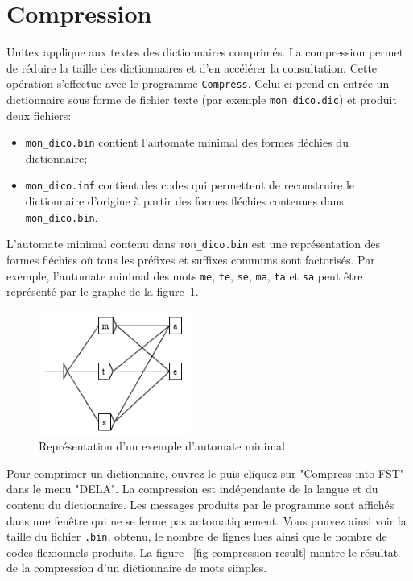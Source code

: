 \section{Compression}

Unitex applique aux textes des dictionnaires comprimés. La compression permet de réduire
la taille des dictionnaires et d’en accélérer la consultation. Cette opération s’effectue
avec le programme \verb+Compress+. 
Celui-ci prend en entrée un dictionnaire sous forme de fichier texte (par exemple
	\verb+mon_dico.dic+) et produit deux fichiers:

\begin{itemize}
  \item \verb+mon_dico.bin+ contient l’automate minimal des formes fléchies du dictionnaire;
  \item \verb+mon_dico.inf+ contient des codes qui permettent de
  	  reconstruire le dictionnaire d’origine à partir
  	  des formes fléchies contenues dans \verb+mon_dico.bin+.
\end{itemize}

\noindent L’automate minimal contenu dans \verb+mon_dico.bin+ est une représentation des formes
fléchies où tous les préfixes et suffixes
communs sont factorisés. Par exemple, l’automate minimal des mots \verb+me+, \verb+te+, \verb+se+,
\verb+ma+, \verb+ta+ et \verb+sa+
peut être représenté par le graphe de la figure~\ref{fig-example-minimal-automaton}.
\bigskip \begin{figure}[!h]
\begin{center}
\includegraphics[width=5cm]{resources/img/fig3-10.png}
\caption{Représentation d’un exemple d’automate minimal\label{fig-example-minimal-automaton}}
\end{center}
\end{figure}

\noindent    Pour comprimer un dictionnaire, ouvrez-le puis cliquez sur "Compress into FST" dans le
menu "DELA". La compression est indépendante de la langue et du contenu du dictionnaire.
Les messages produits par le programme sont affichés dans une fenêtre qui ne se ferme pas
automatiquement. Vous pouvez ainsi voir la taille du fichier
\verb+.bin+, obtenu, le nombre de lignes lues ainsi que le nombre de codes flexionnels produits. La
figure ~\ref{fig-compression-result}
montre le résultat de la compression d’un dictionnaire de mots simples.

